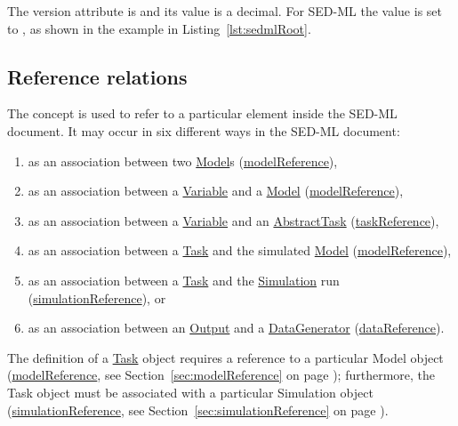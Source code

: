 The version attribute is  and its value is a  decimal. For SED-ML \currentLV the value is set to , as shown in the example in Listing~\ref{lst:sedmlRoot}.


\subsection{Reference relations}
\label{sec:reference}

The  concept is used to refer to a particular element inside the SED-ML document. It may occur in six different ways in the SED-ML document:

\begin{enumerate}
\item{as an association between two \hyperref[class:model]{Model}s (\hyperref[sec:modelReference]{modelReference}),}
\item{as an association between a \hyperref[class:variable]{Variable} and a \hyperref[class:model]{Model} (\hyperref[sec:modelReference]{modelReference}),}
\item{as an association between a \hyperref[class:variable]{Variable} and an \hyperref[class:abstractTask]{AbstractTask} (\hyperref[sec:taskReference]{taskReference}),}
\item{as an association between a \hyperref[class:task]{Task} and the simulated \hyperref[class:model]{Model} (\hyperref[sec:modelReference]{modelReference}),}
\item{as an association between a \hyperref[class:task]{Task} and the \hyperref[class:simulation]{Simulation} run (\hyperref[sec:simulationReference]{simulationReference}), or}
\item{as an association between an \hyperref[class:output]{Output} and a \hyperref[class:dataGenerator]{DataGenerator} (\hyperref[sec:dataReference]{dataReference}).}
\end{enumerate}

The definition of a \hyperref[class:task]{Task} object requires a reference to a particular Model object (\hyperref[sec:modelReference]{modelReference}, see Section~\ref{sec:modelReference} on page \pageref{sec:modelReference}); furthermore, the Task object must be associated with a particular Simulation object (\hyperref[sec:simulationReference]{simulationReference}, see Section~\ref{sec:simulationReference} on page \pageref{sec:simulationReference}).

